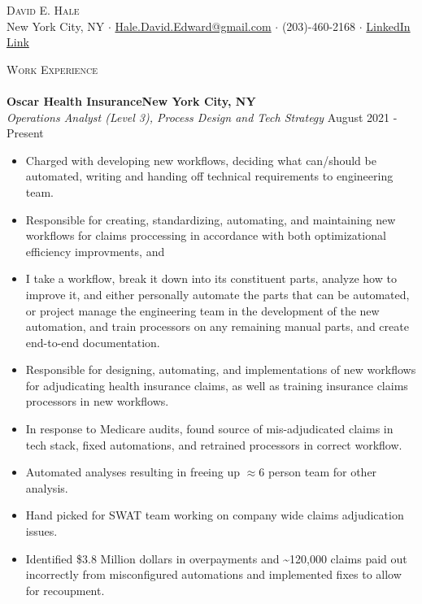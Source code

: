 \documentclass[a4paper]{article}
\newcommand{\lineunder} {
    \vspace*{-8pt} \\
    \hspace*{-18pt} \hrulefill \\
}
\newcommand{\header} [1] {
    {\hspace*{-18pt}\vspace*{6pt} \textsc{#1}}
    \vspace*{-6pt} \lineunder
}
\begin{document}
\vspace*{-40pt}

    

\vspace*{-9pt}
\begin{center}
	{\Large \scshape {David E. Hale}}\\
	New York City, NY $\cdot$ \href{mailto:Hale.David.Edward@gmail.com}{Hale.David.Edward@gmail.com} $\cdot$ (203)-460-2168 $\cdot$ \href{http://linkedin.com/in/david-hale-2598a791/}{LinkedIn Link}\\
\end{center}

\header{Work Experience}
\vspace{1mm}
\textbf{Oscar Health Insurance\hfill New York City, NY}\\
\textit{Operations Analyst (Level 3), Process Design and Tech Strategy} \hfill August 2021 - Present\\
\vspace{-1mm}
\begin{itemize} \itemsep 1pt

    \item   Charged with developing new workflows, deciding what can/should be automated, writing and handing off technical requirements to engineering team. 

    \item   Responsible for creating, standardizing, automating, and maintaining new workflows for claims proccessing in accordance with both optimizational efficiency improvments, and 
	\item 	I take a workflow, break it down into its constituent parts, analyze how to improve it, and either personally automate the parts that can be automated, or project manage the engineering team in the development of the new automation, and train processors on any remaining manual parts, and create end-to-end documentation.
	\item 	Responsible for designing, automating, and implementations of new workflows for adjudicating health insurance claims, as well as training insurance claims processors in new workflows.
	\item 	In response to Medicare audits, found source of mis-adjudicated claims in tech stack, fixed automations, and retrained processors in correct workflow.
	\item 	Automated analyses resulting in freeing up $\approx{6}$ person team for other analysis.
	\item 	Hand picked for SWAT team working on company wide claims adjudication issues.
	\item 	Identified \$3.8 Million dollars in overpayments and \textasciitilde{}120,000 claims paid out incorrectly from misconfigured automations and implemented fixes to allow for recoupment.
\end{itemize}
\end{document}
